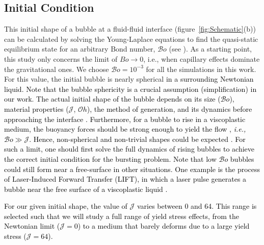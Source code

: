 \documentclass[final]{jfm}
\newcommand*\red{\textcolor{black}}
\begin{document}
\subsection{Initial Condition}\label{Sec::Initial}
This initial shape of a bubble at a fluid-fluid interface (figure~\ref{fig:Schematic}(b)) can be calculated by solving the Young-Laplace equations to find the quasi-static equilibrium state for an arbitrary Bond number, $\mathcal{B}o$ (see \citet{lhuissier2012bursting, walls2015jet, deike2018dynamics,magnaudet2020particles}). As a starting point, this study only concerns the limit of $Bo \rightarrow 0$, i.e., when capillary effects dominate the gravitational ones. We choose $\mathcal{B}o = 10^{-3}$ for all the simulations in this work.  For this value, the initial bubble is nearly spherical \red{in a surrounding Newtonian liquid.}  \red{Note that the bubble sphericity is a crucial assumption (simplification) in our work. The actual initial shape of the bubble depends on its size ($\mathcal{B}o$), material properties ($\mathcal{J}$, $\mathcal{O}h$), the method of generation, and its dynamics before approaching the interface \citep{dubash2004conditions, dimakopoulos2013steady}. Furthermore, for a bubble to rise in a viscoplastic medium, the buoyancy forces should be strong enough to yield the flow \citep{dubash2004conditions, sikorski2009motion, balmforth2014yielding}, \textit{i.e.,} $\mathcal{B}o \gg \mathcal{J}$. Hence, non-spherical and non-trivial shapes could be expected \citep{lopez2018rising}. For such a limit, one should first solve the full dynamics of rising bubbles to achieve the correct initial condition for the bursting problem. Note that low $\mathcal{B}o$ bubbles could still form near a free-surface in other situations. One example is the process of Laser-Induced Forward Transfer (LIFT), in which a laser pulse generates a bubble near the free surface of a viscoplastic liquid \citep{jalaal2019laser}.}

\red{For our given initial shape, the value of $\mathcal{J}$ varies between 0 and 64. This range is selected such that we will study a full range of yield stress effects, from the Newtonian limit ($\mathcal{J}=0$) to a medium that barely deforms due to a large yield stress ($\mathcal{J}=64$).}
\end{document}
